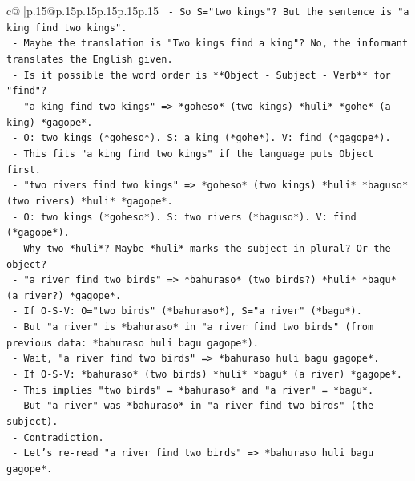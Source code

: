 \documentclass{article}
\begin{document}
{\begin{supertabular}{c@{$\;$}|p{.15\linewidth}@{}p{.15\linewidth}p{.15\linewidth}p{.15\linewidth}p{.15\linewidth}p{.15\linewidth}}
{{{\texttt{              {-} So S="two kings"? But the sentence is "a king find two kings".} \\
\texttt{              {-} Maybe the translation is "Two kings find a king"? No, the informant translates the English given.} \\
\texttt{              {-} Is it possible the word order is **Object {-} Subject {-} Verb** for "find"?} \\
\texttt{              {-} "a king find two kings" => *goheso* (two kings) *huli* *gohe* (a king) *gagope*.} \\
\texttt{                {-} O: two kings (*goheso*). S: a king (*gohe*). V: find (*gagope*).} \\
\texttt{                {-} This fits "a king find two kings" if the language puts Object first.} \\
\texttt{              {-} "two rivers find two kings" => *goheso* (two kings) *huli* *baguso* (two rivers) *huli* *gagope*.} \\
\texttt{                {-} O: two kings (*goheso*). S: two rivers (*baguso*). V: find (*gagope*).} \\
\texttt{                {-} Why two *huli*? Maybe *huli* marks the subject in plural? Or the object?} \\
\texttt{                {-} "a river find two birds" => *bahuraso* (two birds?) *huli* *bagu* (a river?) *gagope*.} \\
\texttt{                  {-} If O{-}S{-}V: O="two birds" (*bahuraso*), S="a river" (*bagu*).} \\
\texttt{                  {-} But "a river" is *bahuraso* in "a river find two birds" (from previous data: *bahuraso huli bagu gagope*).} \\
\texttt{                  {-} Wait, "a river find two birds" => *bahuraso huli bagu gagope*.} \\
\texttt{                  {-} If O{-}S{-}V: *bahuraso* (two birds) *huli* *bagu* (a river) *gagope*.} \\
\texttt{                  {-} This implies "two birds" = *bahuraso* and "a river" = *bagu*.} \\
\texttt{                  {-} But "a river" was *bahuraso* in "a river find two birds" (the subject).} \\
\texttt{                  {-} Contradiction.} \\
\texttt{                  {-} Let's re{-}read "a river find two birds" => *bahuraso huli bagu gagope*.} \\
}}}
\end{supertabular}}
\end{document}
